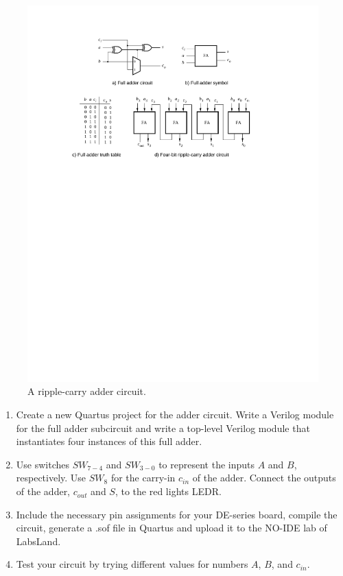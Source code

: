 \documentclass[epsfig,10pt,fullpage]{article}
\begin{document}
\begin{figure}[H]
	\begin{center}
		\includegraphics[]{figures/figure2.pdf}
	\end{center}
\caption{A ripple-carry adder circuit.}
\label{fig:fig2}
\end{figure}

\begin{enumerate}
\item Create a new Quartus project for the adder circuit. Write a Verilog module
for the full adder subcircuit and write a top-level Verilog module that instantiates four 
instances of this full adder.
\item Use switches $SW_{7-4}$ and $SW_{3-0}$ to represent the inputs $A$ and $B$, respectively.
Use $SW_{8}$ for the carry-in $c_{in}$ of the adder. Connect the outputs of the adder, 
$c_{out}$ and $S$, to the red lights LEDR.
\item Include the necessary pin assignments for your DE-series board, compile the circuit, generate a .sof file in Quartus and upload it to the NO-IDE lab of LabsLand.
\item Test your circuit by trying different values for numbers $A$, $B$, and $c_{in}$.
\end{enumerate}
\end{document}
